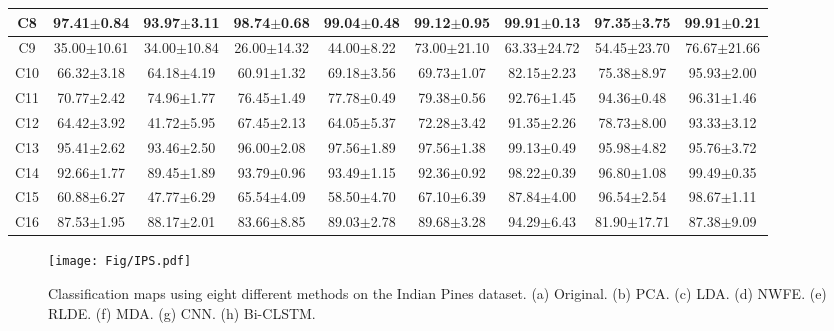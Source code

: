 \documentclass[12pt,onecolumn]{IEEEtran}
\begin{document}
\begin{spacing}{2}
\begin{table}
\begin{tabular}{|c|c|c|c|c|c|c|c|c|}
C8    & 97.41$\pm$0.84 & 93.97$\pm$3.11 & 98.74$\pm$0.68  & 99.04$\pm$0.48 & 99.12$\pm$0.95 & 99.91$\pm$0.13      & 97.35$\pm$3.75 & 99.91$\pm$0.21\\ \hline
C9    & 35.00$\pm$10.61  & 34.00$\pm$10.84  & 26.00$\pm$14.32  & 44.00$\pm$8.22  & 73.00$\pm$21.10  & 63.33$\pm$24.72&54.45$\pm$23.70  & 76.67$\pm$21.66 \\ \hline
C10    & 66.32$\pm$3.18 & 64.18$\pm$4.19 & 60.91$\pm$1.32 & 69.18$\pm$3.56 & 69.73$\pm$1.07 & 82.15$\pm$2.23     & 75.38$\pm$8.97  & 95.93$\pm$2.00 \\ \hline
C11    & 70.77$\pm$2.42  & 74.96$\pm$1.77  & 76.45$\pm$1.49 & 77.78$\pm$0.49 & 79.38$\pm$0.56 & 92.76$\pm$1.45   & 94.36$\pm$0.48 & 96.31$\pm$1.46 \\ \hline
C12    & 64.42$\pm$3.92 & 41.72$\pm$5.95 & 67.45$\pm$2.13  & 64.05$\pm$5.37 & 72.28$\pm$3.42 & 91.35$\pm$2.26     & 78.73$\pm$8.00 & 93.33$\pm$3.12\\ \hline
C13    & 95.41$\pm$2.62  & 93.46$\pm$2.50  & 96.00$\pm$2.08  & 97.56$\pm$1.89  & 97.56$\pm$1.38  & 99.13$\pm$0.49  & 95.98$\pm$4.82  & 95.76$\pm$3.72 \\ \hline
C14    & 92.66$\pm$1.77 & 89.45$\pm$1.89 & 93.79$\pm$0.96 & 93.49$\pm$1.15 & 92.36$\pm$0.92 & 98.22$\pm$0.39     & 96.80$\pm$1.08  & 99.49$\pm$0.35 \\ \hline
C15    & 60.88$\pm$6.27  & 47.77$\pm$6.29  & 65.54$\pm$4.09 & 58.50$\pm$4.70 & 67.10$\pm$6.39 & 87.84$\pm$4.00    & 96.54$\pm$2.54 & 98.67$\pm$1.11 \\ \hline
C16    & 87.53$\pm$1.95 & 88.17$\pm$2.01 & 83.66$\pm$8.85  & 89.03$\pm$2.78 & 89.68$\pm$3.28 & 94.29$\pm$6.43    & 81.90$\pm$17.71 & 87.38$\pm$9.09\\ \hline
\end{tabular}
\end{table}

\begin{figure}[!htb]
  \centering
  \texttt{[image: Fig/IPS.pdf]}\\
  \caption{Classification maps using eight different methods on the Indian Pines dataset. (a) Original. (b) PCA. (c) LDA. (d) NWFE. (e) RLDE. (f) MDA. (g) CNN. (h) Bi-CLSTM.}\label{IP_rshow}
\end{figure}


\end{spacing}
\end{document}
